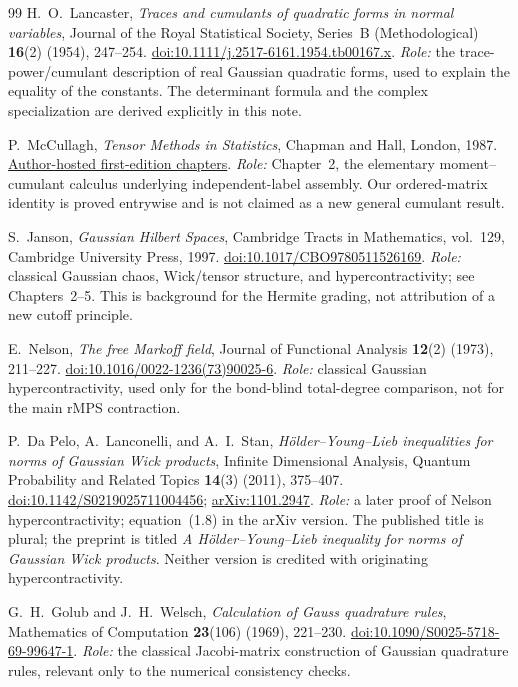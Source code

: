 \documentclass[11pt]{article}
\numberwithin{equation}{section}
\theoremstyle{definition}\newtheorem{definition}[theorem]{Definition}
\theoremstyle{remark}\newtheorem{remark}[theorem]{Remark}
\begin{document}
\begin{thebibliography}{99}
H.~O.~Lancaster,
\emph{Traces and cumulants of quadratic forms in normal variables},
Journal of the Royal Statistical Society, Series~B (Methodological)
\textbf{16}(2) (1954), 247--254.
\href{https://doi.org/10.1111/j.2517-6161.1954.tb00167.x}{doi:10.1111/j.2517-6161.1954.tb00167.x}.
\textit{Role:} the trace-power/cumulant description of real Gaussian quadratic
forms, used to explain the equality of the constants. The determinant formula
and the complex specialization are derived explicitly in this note.

P.~McCullagh,
\emph{Tensor Methods in Statistics}, Chapman and Hall, London, 1987.
\href{https://www.stat.uchicago.edu/~pmcc/tensorbook/}{Author-hosted first-edition chapters}.
\textit{Role:} Chapter~2, the elementary moment--cumulant calculus underlying
independent-label assembly. Our ordered-matrix identity is proved entrywise
and is not claimed as a new general cumulant result.

S.~Janson,
\emph{Gaussian Hilbert Spaces}, Cambridge Tracts in Mathematics, vol.~129,
Cambridge University Press, 1997.
\href{https://doi.org/10.1017/CBO9780511526169}{doi:10.1017/CBO9780511526169}.
\textit{Role:} classical Gaussian chaos, Wick/tensor structure, and
hypercontractivity; see Chapters~2--5. This is background for the Hermite
grading, not attribution of a new cutoff principle.

E.~Nelson,
\emph{The free Markoff field},
Journal of Functional Analysis \textbf{12}(2) (1973), 211--227.
\href{https://doi.org/10.1016/0022-1236(73)90025-6}{doi:10.1016/0022-1236(73)90025-6}.
\textit{Role:} classical Gaussian hypercontractivity, used only for the
bond-blind total-degree comparison, not for the main rMPS contraction.

P.~Da Pelo, A.~Lanconelli, and A.~I.~Stan,
\emph{H\"older--Young--Lieb inequalities for norms of Gaussian Wick products},
Infinite Dimensional Analysis, Quantum Probability and Related Topics
\textbf{14}(3) (2011), 375--407.
\href{https://doi.org/10.1142/S0219025711004456}{doi:10.1142/S0219025711004456};
\href{https://arxiv.org/abs/1101.2947}{arXiv:1101.2947}.
\textit{Role:} a later proof of Nelson hypercontractivity; equation~(1.8) in
the arXiv version. The published title is plural; the preprint is titled
\emph{A H\"older--Young--Lieb inequality for norms of Gaussian Wick products}.
Neither version is credited with originating hypercontractivity.

G.~H.~Golub and J.~H.~Welsch,
\emph{Calculation of Gauss quadrature rules},
Mathematics of Computation \textbf{23}(106) (1969), 221--230.
\href{https://doi.org/10.1090/S0025-5718-69-99647-1}{doi:10.1090/S0025-5718-69-99647-1}.
\textit{Role:} the classical Jacobi-matrix construction of Gaussian quadrature
rules, relevant only to the numerical consistency checks.


\end{thebibliography}
\end{document}
